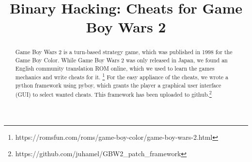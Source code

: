 \documentclass[conference,dvipsnames]{IEEEtran}
\begin{document}
\title{Binary Hacking: Cheats for Game Boy Wars 2}

\author{
}

\maketitle

\begin{abstract}
	Game Boy Wars 2 is a turn-based strategy game, which was published in 1998 for the Game Boy Color.
	While Game Boy Wars 2 was only released in Japan, we found an English community translation ROM online, which we used to learn the games mechanics and write cheats for it. \footnote{https://romsfun.com/roms/game-boy-color/game-boy-wars-2.html}
	For the easy appliance of the cheats, we wrote a python framework using pyboy, which grants the player a graphical user interface (GUI) to select wanted cheats.
	This framework has been uploaded to github.\footnote{https://github.com/juhamel/GBW2\_patch\_framework}
\end{abstract}






\clearpage
%
\end{document}
